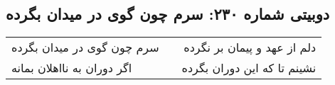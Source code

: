 \begin{center}
\section*{دوبیتی شماره ۲۳۰: سرم چون گوی در میدان بگرده}
\label{sec:230}
\begin{longtable}{l p{0.5cm} r}
سرم چون گوی در میدان بگرده
&&
دلم از عهد و پیمان بر نگرده
\\
اگر دوران به نااهلان بمانه
&&
نشینم تا که این دوران بگرده
\\
\end{longtable}
\end{center}

